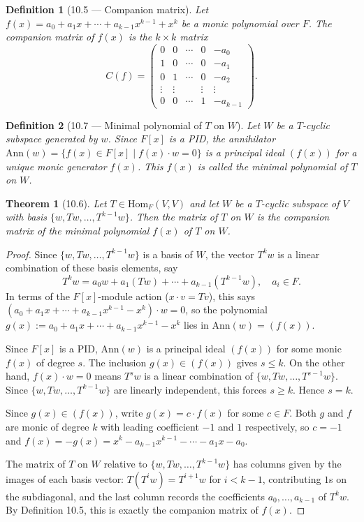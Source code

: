 \documentclass[12pt]{article}
\newtheorem{theorem}{Theorem}
\newtheorem{definition}{Definition}
\begin{document}
\begin{definition}[10.5 — Companion matrix]
Let $f(x) = a_0 + a_1x + \cdots + a_{k-1}x^{k-1} + x^k$ be a monic polynomial over $F$. The \emph{companion matrix} of $f(x)$ is the $k \times k$ matrix
\[
C(f) =
\begin{pmatrix}
0      & 0      & \cdots & 0      & -a_0     \\
1      & 0      & \cdots & 0      & -a_1     \\
0      & 1      & \cdots & 0      & -a_2     \\
\vdots & \vdots &        & \vdots & \vdots   \\
0      & 0      & \cdots & 1      & -a_{k-1}
\end{pmatrix}.
\]
\end{definition}

\begin{definition}[10.7 — Minimal polynomial of $T$ on $W$]
Let $W$ be a $T$-cyclic subspace generated by $w$. Since $F[x]$ is a PID, the annihilator $\mathrm{Ann}(w) = \{f(x) \in F[x] \mid f(x) \cdot w = 0\}$ is a principal ideal $(f(x))$ for a unique monic generator $f(x)$. This $f(x)$ is called the \emph{minimal polynomial} of $T$ on $W$.
\end{definition}

\begin{theorem}[10.6]
Let $T \in \mathrm{Hom}_F(V,V)$ and let $W$ be a $T$-cyclic subspace of $V$ with basis $\{w, Tw, \ldots, T^{k-1}w\}$. Then the matrix of $T$ on $W$ is the companion matrix of the minimal polynomial $f(x)$ of $T$ on $W$.
\end{theorem}

\begin{proof}
Since $\{w, Tw, \ldots, T^{k-1}w\}$ is a basis of $W$, the vector $T^kw$ is a linear combination of these basis elements, say
\[
  T^kw = a_0w + a_1(Tw) + \cdots + a_{k-1}(T^{k-1}w), \quad a_i \in F.
\]
In terms of the $F[x]$-module action ($x \cdot v = Tv$), this says $(a_0 + a_1x + \cdots + a_{k-1}x^{k-1} - x^k) \cdot w = 0$, so the polynomial $g(x) := a_0 + a_1x + \cdots + a_{k-1}x^{k-1} - x^k$ lies in $\mathrm{Ann}(w) = (f(x))$.

Since $F[x]$ is a PID, $\mathrm{Ann}(w)$ is a principal ideal $(f(x))$ for some monic $f(x)$ of degree $s$. The inclusion $g(x) \in (f(x))$ gives $s \leq k$. On the other hand, $f(x) \cdot w = 0$ means $T^sw$ is a linear combination of $\{w, Tw, \ldots, T^{s-1}w\}$. Since $\{w, Tw, \ldots, T^{k-1}w\}$ are linearly independent, this forces $s \geq k$. Hence $s = k$.

Since $g(x) \in (f(x))$, write $g(x) = c \cdot f(x)$ for some $c \in F$. Both $g$ and $f$ are monic of degree $k$ with leading coefficient $-1$ and $1$ respectively, so $c = -1$ and $f(x) = -g(x) = x^k - a_{k-1}x^{k-1} - \cdots - a_1x - a_0$.

The matrix of $T$ on $W$ relative to $\{w, Tw, \ldots, T^{k-1}w\}$ has columns given by the images of each basis vector: $T(T^iw) = T^{i+1}w$ for $i < k-1$, contributing $1$s on the subdiagonal, and the last column records the coefficients $a_0, \ldots, a_{k-1}$ of $T^kw$. By Definition 10.5, this is exactly the companion matrix of $f(x)$.
\end{proof}
\end{document}
